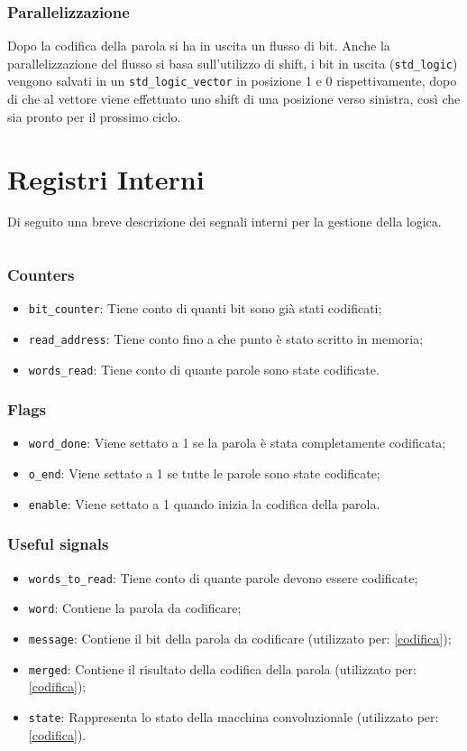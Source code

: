 \subsubsection{Parallelizzazione}
Dopo la codifica della parola si ha in uscita un flusso di bit. Anche la parallelizzazione del flusso si basa sull'utilizzo di shift, i bit in uscita (\texttt{std\_logic}) vengono salvati in un \texttt{std\_logic\_vector} in posizione 1 e 0 rispettivamente, dopo di che al vettore viene effettuato uno shift di una posizione verso sinistra, così che sia pronto per il prossimo ciclo.

\section{Registri Interni}
Di seguito una breve descrizione dei segnali interni per la gestione della logica.
\inputminted{vhdl}{listings/Capitolo2/signals.vhd}
\subsubsection{Counters}
\begin{itemize}
    \item \texttt{bit\_counter}: Tiene conto di quanti bit sono già stati codificati;
    \item \texttt{read\_address}: Tiene conto fino a che punto è stato scritto in memoria;
    \item \texttt{words\_read}: Tiene conto di quante parole sono state codificate.
\end{itemize}
\subsubsection{Flags}
\begin{itemize}
    \item \texttt{word\_done}: Viene settato a 1 se la parola è stata completamente codificata;
    \item \texttt{o\_end}: Viene settato a 1 se tutte le parole sono state codificate;
    \item \texttt{enable}: Viene settato a 1 quando inizia la codifica della parola.
\end{itemize}
\subsubsection{Useful signals}
\begin{itemize}
    \item \texttt{words\_to\_read}: Tiene conto di quante parole devono essere codificate;
    \item \texttt{word}: Contiene la parola da codificare;
    \item \texttt{message}: Contiene il bit della parola da codificare (utilizzato per: \ref{codifica});
    \item \texttt{merged}: Contiene il risultato della codifica della parola (utilizzato per: \ref{codifica}); 
    \item \texttt{state}: Rappresenta lo stato della macchina convoluzionale (utilizzato per: \ref{codifica}).
\end{itemize}

